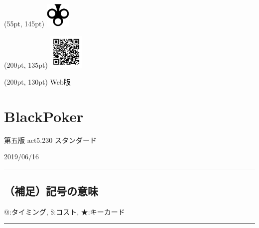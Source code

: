 \documentclass[twocolumn,a5paper,papersize,10pt]{jarticle}
\title{\empty}
\author{\empty}
\date{\empty}
\begin{document}
\begin{textblock*}{0.4\linewidth}(55pt, 145pt)
    \centering
    \includegraphics[width=1.2cm]{blackpoker_logo.pdf}
\end{textblock*}

\begin{textblock*}{0.4\linewidth}(200pt, 135pt)
    \centering
    \includegraphics[width=1.7cm,keepaspectratio]{qr_blackpoker-support_v5-std.pdf}
\end{textblock*}
\begin{textblock*}{0.4\linewidth}(200pt, 130pt)
    \centering
    \textcolor{black}{Web版}
\end{textblock*}


\section*{\textrm{\Large BlackPoker}}
\vspace{-1zh}%
\noindent

\begin{center}
{\footnotesize 第五版 act5.230 スタンダード}

{\scriptsize 2019/06/16}
\end{center}

\scriptsize%
\renewcommand{\labelitemi}{・}%
\hrule height 0.5mm depth 0mm width 66.5mm %
\vspace{-3zh}%
\subsection*{（補足）記号の意味}
\vspace{-1zh}%
{\small @:タイミング, 
\$:コスト, 
★:キーカード}

\vspace{1mm}%
\hrule height 0.1mm depth 0mm width 66.5mm %
\vspace{-3zh}%
\end{document}
